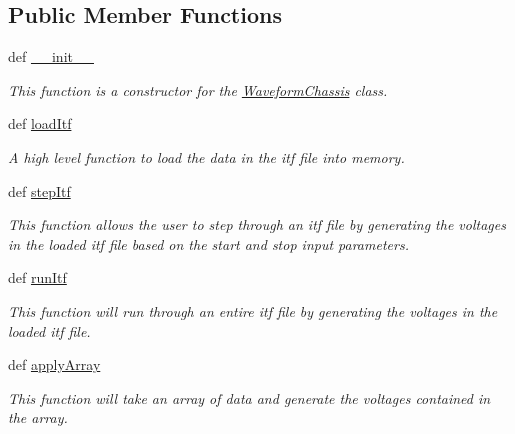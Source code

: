 \subsection*{Public Member Functions}
\begin{DoxyCompactItemize}
\item 
def \hyperlink{class_chassis_8git_1_1_waveform_chassis_1_1_waveform_chassis_a63b700f5fce0e49c55597c40e3798fd0}{\-\_\-\-\_\-init\-\_\-\-\_\-}
\begin{DoxyCompactList}\small\item\em This function is a constructor for the \hyperlink{class_chassis_8git_1_1_waveform_chassis_1_1_waveform_chassis}{Waveform\-Chassis} class. \end{DoxyCompactList}\item 
def \hyperlink{class_chassis_8git_1_1_waveform_chassis_1_1_waveform_chassis_afb17a99247044103a60826a2357f4bed}{load\-Itf}
\begin{DoxyCompactList}\small\item\em A high level function to load the data in the itf file into memory. \end{DoxyCompactList}\item 
def \hyperlink{class_chassis_8git_1_1_waveform_chassis_1_1_waveform_chassis_a9b6ce2f7198a17174291c897223fed5c}{step\-Itf}
\begin{DoxyCompactList}\small\item\em This function allows the user to step through an itf file by generating the voltages in the loaded itf file based on the start and stop input parameters. \end{DoxyCompactList}\item 
def \hyperlink{class_chassis_8git_1_1_waveform_chassis_1_1_waveform_chassis_a7d54d1cb22401a78d82d4d36451ffe7e}{run\-Itf}
\begin{DoxyCompactList}\small\item\em This function will run through an entire itf file by generating the voltages in the loaded itf file. \end{DoxyCompactList}\item 
def \hyperlink{class_chassis_8git_1_1_waveform_chassis_1_1_waveform_chassis_a7e0c50ee0735e6d2e77e09e67bd8ca8e}{apply\-Array}
\begin{DoxyCompactList}\small\item\em This function will take an array of data and generate the voltages contained in the array. \end{DoxyCompactList}\end{DoxyCompactItemize}
